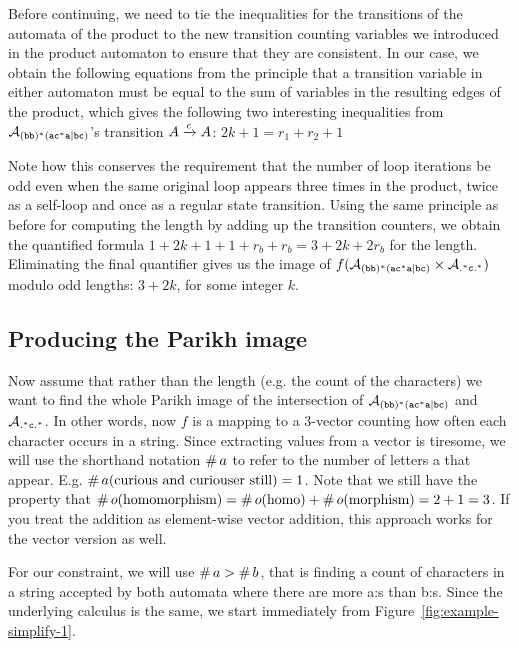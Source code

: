 \documentclass[acmsmall,review,anonymous,screen]{acmart}\settopmatter{printfolios=true,printccs=false,printacmref=true}
\theoremstyle{definition}
\begin{document}
Before continuing, we need to tie the inequalities for the transitions of the
automata of the product to the new transition counting variables we introduced
in the product automaton to ensure that they are consistent. In our case, we
obtain the following equations from the principle that a transition variable in
either automaton must be equal to the sum of variables in the resulting edges of
the product, which gives the following two interesting inequalities from
$\mathcal{A}_{\mathtt{(bb)^\ast(ac^\ast{}a|bc)}}{}$'s transition $A \xrightarrow{c} A$: $2k + 1 = r_1 + r_2 + 1$

Note how this conserves the requirement that the number of loop iterations be
odd even when the same original loop appears three times in the product, twice
as a self-loop and once as a regular state transition. Using the same principle
as before for computing the length by adding up the transition counters, we
obtain the quantified formula $1 + 2k + 1 + 1 + r_b + r_b= 3 + 2k + 2r_b$ for
the length. Eliminating the final quantifier gives us the image of $f(\mathcal{A}_{\mathtt{(bb)^\ast(ac^\ast{}a|bc)}}
\times \mathcal{A}_{\mathtt{.^\ast{}c.^\ast}})$ modulo odd lengths: $3 + 2k$, for some integer
$k$.

\subsection{Producing the Parikh image}\label{sec:introduction:parikh}

Now assume that rather than the length (e.g. the count of the characters) we
want to find the whole Parikh image of the intersection of $\mathcal{A}_{\mathtt{(bb)^\ast(ac^\ast{}a|bc)}}{}$ and
$\mathcal{A}_{\mathtt{.^\ast{}c.^\ast}}{}$. In other words, now $f$ is a mapping to a 3-vector
counting how often each character occurs in a string. Since extracting values
from a vector is tiresome, we will use the shorthand notation
$\operatorname{\#}{a}$ to refer to the number of letters a that appear. E.g.
$\operatorname{\#}{a}(\text{curious and curiouser still}) = 1$. Note that we
still have the property that $\operatorname{\#}{o}(\text{homomorphism}) =
\operatorname{\#}{o}(\text{homo}) + \operatorname{\#}{o}(\text{morphism}) = 2 + 1
= 3$. If you treat the addition as element-wise vector addition, this approach
works for the vector version as well.

For our constraint, we will use $\operatorname{\#}{a} > \operatorname{\#}{b}$,
that is finding a count of characters in a string accepted by both automata where
there are more a:s than b:s. Since the underlying calculus is the same, we start immediately from Figure~\ref{fig:example-simplify-1}.
\end{document}
